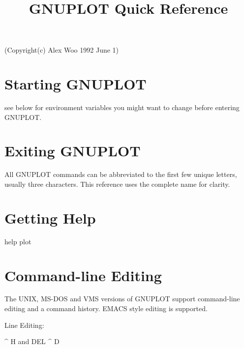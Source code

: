 

\title{GNUPLOT Quick Reference}

\centerline{(Copyright(c) Alex Woo 1992 June 1)}

\section{Starting GNUPLOT}


see below for  environment variables you might want to change
before entering GNUPLOT.

\section{Exiting GNUPLOT}


All GNUPLOT commands can be abbreviated to the first few
unique letters, usually three characters.  This reference uses
the complete name for clarity.

\section{Getting Help}

 {help plot}
\section{Command-line Editing}

The UNIX, MS-DOS and VMS versions of GNUPLOT support command-line
editing and a command history.  EMACS style editing is supported.

\beginindentedkeys

Line Editing:

 {^ H and DEL }
  {^ D}
\endindentedkeys
\beginindentedkeys

